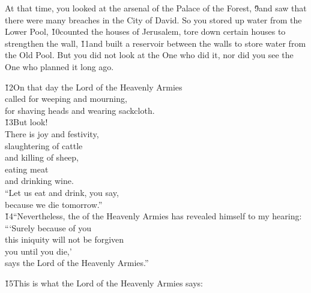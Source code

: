 At that time, you looked at the arsenal of the Palace of the Forest, \v{9}and saw that there were many breaches in the City of David. So you stored up water from the Lower Pool, \v{10}counted the houses of Jerusalem, tore down certain houses to strengthen the wall, \v{11}and built a reservoir between the walls to store water from the Old Pool. But you did not look at the One who did it, nor did you see the One who planned it long ago.

\begin{poetry}
\poeml \v{12}On that day the Lord  of the Heavenly Armies \\
\poemll    called for weeping and mourning, \\
\poemlll       for shaving heads and wearing sackcloth. \\
\poeml \v{13}But look! \\
\poemll    There is joy and festivity, \\
\poeml slaughtering of cattle \\
\poemll    and killing of sheep, \\
\poeml eating meat \\
\poemll    and drinking wine. \\
\poeml ``Let us eat and drink, you say, \\
\poemll    because we die tomorrow.'' \\
\poeml \v{14}``Nevertheless, the  of the Heavenly Armies has revealed himself to my hearing: \\
\poeml ```Surely because of you \\
\poemll    this iniquity will not be forgiven \\
\poemlll       you until you die,' \\
\poeml says the Lord  of the Heavenly Armies.''
\end{poetry}

\v{15}This is what the Lord  of the Heavenly Armies says:


